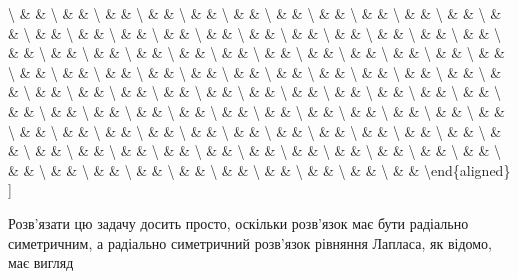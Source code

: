 \documentclass[
]{article}
\begin{document}
{{{\textbackslash{} \& \& \textbackslash{} \& \& \textbackslash{} \& \&
\textbackslash{} \& \& \textbackslash{} \& \& \textbackslash{} \& \&
\textbackslash{} \& \& \textbackslash{} \& \& \textbackslash{} \& \&
\textbackslash{} \& \& \textbackslash{} \& \& \textbackslash{} \& \&
\textbackslash{} \& \& \textbackslash{} \& \& \textbackslash{} \& \&
\textbackslash{} \& \& \textbackslash{} \& \& \textbackslash{} \& \&
\textbackslash{} \& \& \textbackslash{} \& \& \textbackslash{} \& \&
\textbackslash{} \& \& \textbackslash{} \& \& \textbackslash{} \& \&
\textbackslash{} \& \& \textbackslash{} \& \& \textbackslash{} \& \&
\textbackslash{} \& \& \textbackslash{} \& \& \textbackslash{} \& \&
\textbackslash{} \& \& \textbackslash{} \& \& \textbackslash{} \& \&
\textbackslash{} \& \& \textbackslash{} \& \& \textbackslash{} \& \&
\textbackslash{} \& \& \textbackslash{} \& \& \textbackslash{} \& \&
\textbackslash{} \& \& \textbackslash{} \& \& \textbackslash{} \& \&
\textbackslash{} \& \& \textbackslash{} \& \& \textbackslash{} \& \&
\textbackslash{} \& \& \textbackslash{} \& \& \textbackslash{} \& \&
\textbackslash{} \& \& \textbackslash{} \& \& \textbackslash{} \& \&
\textbackslash{} \& \& \textbackslash{} \& \& \textbackslash{} \& \&
\textbackslash{} \& \& \textbackslash{} \& \& \textbackslash{} \& \&
\textbackslash{} \& \& \textbackslash{} \& \& \textbackslash{} \& \&
\textbackslash{} \& \& \textbackslash{} \& \& \textbackslash{} \& \&
\textbackslash{} \& \& \textbackslash{} \& \& \textbackslash{} \& \&
\textbackslash{} \& \& \textbackslash{} \& \& \textbackslash{} \& \&
\textbackslash{} \& \& \textbackslash{} \& \& \textbackslash{} \& \&
\textbackslash{} \& \& \textbackslash{} \& \& \textbackslash{} \& \&
\textbackslash{} \& \& \textbackslash{} \& \& \textbackslash{} \& \&
\textbackslash{} \& \& \textbackslash{} \& \& \textbackslash{} \& \&
\textbackslash{} \& \& \textbackslash{} \& \& \textbackslash{} \& \&
\textbackslash{} \& \& \textbackslash{} \& \& \textbackslash{} \& \&
\textbackslash{} \& \& \textbackslash{} \& \& \textbackslash{} \& \&
\textbackslash{} \& \& \textbackslash{} \& \& \textbackslash{} \& \&
\textbackslash{} \& \& \textbackslash{} \& \& \textbackslash{} \& \&
\textbackslash{} \& \& \textbackslash{} \& \& \textbackslash{} \& \&
\textbackslash{} \& \& \textbackslash{} \& \& \textbackslash{} \& \&
\textbackslash{} \& \& \textbackslash end\{aligned\} {]}

Розв'язати цю задачу досить просто, оскільки розв'язок має бути
радіально симетричним, а радіально симетричний розв'язок рівняння
Лапласа, як відомо, має вигляд

}}}
\end{document}
